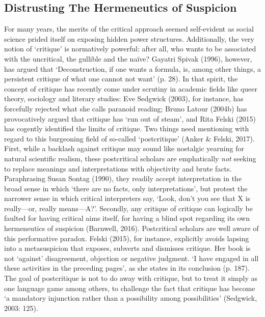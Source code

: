 \begin{adjmulticols}{2}{0mm}{0mm}
\section{Distrusting The Hermeneutics of Suspicion}
For many years, the merits of the critical approach seemed self-evident as social science prided itself on exposing hidden power structures. Additionally, the very notion of ‘critique’ is normatively powerful: after all, who wants to be associated with the uncritical, the gullible and the naïve? Gayatri Spivak (1996), however, has argued that ‘Deconstruction, if one wants a formula, is, among other things, a persistent critique of what one cannot not want’ (p. 28). In that spirit, the concept of critique has recently come under scrutiny in academic fields like queer theory, sociology and literary studies: Eve Sedgwick (2003), for instance, has forcefully rejected what she calls paranoid reading; Bruno Latour (2004b) has provocatively argued that critique has ‘run out of steam’, and Rita Felski (2015) has cogently identified the limits of critique. Two things need mentioning with regard to this burgeoning field of so-called ‘postcritique’ (Anker \& Felski, 2017). First, while a backlash against critique may sound like nostalgic yearning for natural scientific realism, these postcritical scholars are emphatically \textit{not} seeking to replace meanings and interpretations with objectivity and brute facts. Paraphrasing Susan Sontag (1990), they readily accept interpretation in the broad sense in which ‘there are no facts, only interpretations’, but protest the narrower sense in which critical interpreters say, ‘Look, don’t you see that X is really—or, really means—A?’. Secondly, any critique of critique can logically be faulted for having critical aims itself, for having a blind spot regarding its own hermeneutics of suspicion (Barnwell, 2016). Postcritical scholars are well aware of this performative paradox. Felski (2015), for instance, explicitly avoids lapsing into a metasuspicion that exposes, subverts and dismisses critique. Her book is not ‘against’ disagreement, objection or negative judgment. ‘I have engaged in all these activities in the preceding pages’, as she states in its conclusion (p. 187). The goal of postcritique is not to do away with critique, but to treat it simply as one language game among others, to challenge the fact that critique has become ‘a mandatory injunction rather than a possibility among possibilities’ (Sedgwick, 2003: 125). 


\end{adjmulticols}
